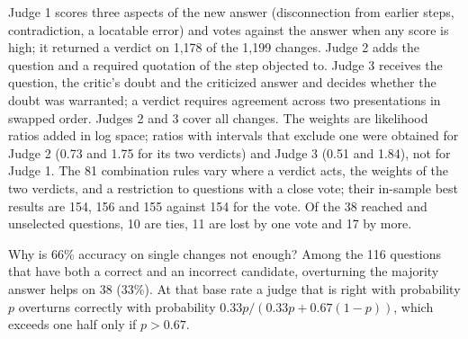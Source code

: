 \documentclass[11pt]{article}
\begin{document}
Judge 1 scores three aspects of the new answer (disconnection from earlier steps, contradiction, a locatable error) and votes against the answer when any score is high; it returned a verdict on 1{,}178 of the 1{,}199 changes.
Judge 2 adds the question and a required quotation of the step objected to.
Judge 3 receives the question, the critic's doubt and the criticized answer and decides whether the doubt was warranted; a verdict requires agreement across two presentations in swapped order.
Judges 2 and 3 cover all changes.
The weights are likelihood ratios added in log space; ratios with intervals that exclude one were obtained for Judge 2 (0.73 and 1.75 for its two verdicts) and Judge 3 (0.51 and 1.84), not for Judge 1.
The 81 combination rules vary where a verdict acts, the weights of the two verdicts, and a restriction to questions with a close vote; their in-sample best results are 154, 156 and 155 against 154 for the vote.
Of the 38 reached and unselected questions, 10 are ties, 11 are lost by one vote and 17 by more.

Why is 66\% accuracy on single changes not enough?
Among the 116 questions that have both a correct and an incorrect candidate, overturning the majority answer helps on 38 (33\%).
At that base rate a judge that is right with probability $p$ overturns correctly with probability $0.33p/(0.33p+0.67(1-p))$, which exceeds one half only if $p>0.67$.
\end{document}
